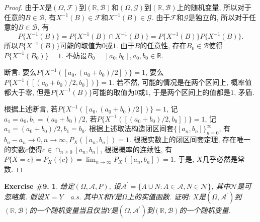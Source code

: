 \documentclass[UTF8, a4paper]{article}
\newtheorem{exercise}{Exercise \#9.}
\begin{document}
\begin{proof}
由于\(X\)是\((\Omega, \mathcal{F})\)到\((\mathbb{R}, \mathcal{B})\)和\((\Omega, \mathcal{G})\)到\((\mathbb{R}, \mathcal{B})\)上的随机变量, 所以对于任意的\(B \in \mathcal{B}\), 有\(X^{-1}(B) \in \mathcal{F}\)和\(X^{-1}(B) \in \mathcal{G}\).
由于\(\mathcal{F}\)和\(\mathcal{G}\)是独立的, 所以对于任意的\(B \in \mathcal{B}\), 有
\[
P\{X^{-1}(B)\} = P\{X^{-1}(B) \cap X^{-1}(B)\} = P\{X^{-1}(B)\}P\{X^{-1}(B)\}.
\]
所以\(P\{X^{-1}(B)\}\)可能的取值为\(0\)或\(1\).
由于\(B\)的任意性, 存在\(B_0 \in \mathcal{B}\)使得\(P\{X^{-1}(B_0)\} = 1\).
不妨设\(B_0 = [a_0, b_0], a_0, b_0 \in \mathbb{R}\). 

断言: 要么\(P\{X^{-1}([a_0, (a_0+b_0)/2])\} = 1\), 要么\(P\{X^{-1}([(a_0+b_0)/2, b_0])\} = 1\).
若不然, 可能的情况是在两个区间上, 概率值都大于零, 但是\(P\{X^{-1}(B)\}\)可能的取值为\(0\)或\(1\), 于是两个区间上的值都是\(1\), 矛盾.

根据上述断言, 
若\(P\{X^{-1}([a_0, (a_0+b_0)/2])\} = 1\), 记\(a_1 = a_0, b_1 = (a_0+b_0)/2\),
若\(P\{X^{-1}([(a_0+b_0)/2, b_0])\} = 1\), 记\(a_1 = (a_0+b_0)/2, b_1 = b_0\).
根据上述取法构造闭区间套\(\{[a_n, b_n]\}_{n=0}^\infty\), 有\(b_n - a_n \to 0, n\to\infty, P_X([a_n, b_n]) = 1\).
根据实数上的闭区间套定理, 存在唯一的实数\(c\)使得\(c \in \cap_{n\geq 0}[a_n, b_n]\), 
根据概率的连续性, 有\(P\{X = c\} = P_X(\{c\})= \lim_{n\to\infty} P_X([a_n, b_n]) = 1\).
于是, \(X\)几乎必然是常数.
\end{proof}




\begin{framed}
\begin{exercise}
给定\((\Omega, \mathcal{A}, P)\), 设\(\mathcal{A}^\prime = \{A \cup N : A \in \mathcal{A}, N\in \mathcal{N}\}\), 其中\(\mathcal{N}\)是可忽略集.
假设\(X = Y\quad\)a.s. 其中\(X\)和\(Y\)是\(\Omega\)上的实值函数.
证明: \(X\)是\((\Omega, \mathcal{A}^\prime)\)到\((\mathbb{R}, \mathcal{B})\)的一个随机变量当且仅当\(Y\)是\((\Omega, \mathcal{A}^\prime)\)到\((\mathbb{R}, \mathcal{B})\)的一个随机变量.
\end{exercise}
\end{framed}
\end{document}
